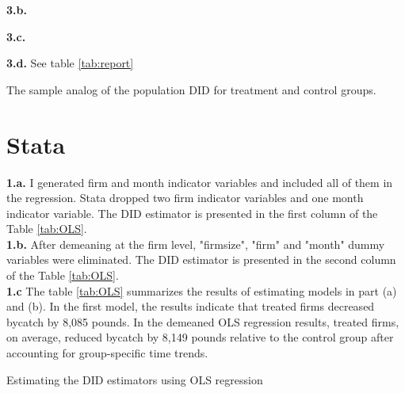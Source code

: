 \documentclass{article}
\begin{document}
\noindent \textbf{3.b.} 

\noindent \textbf{3.c.} 

\noindent \textbf{3.d.} See table \ref{tab:report}

\begin{table}[h]
    \centering
    
    \caption{The sample analog of the population DID for treatment and control groups.}
    \label{tab:report}
\end{table}


\section{Stata}

\noindent \textbf{1.a.} I generated firm and month indicator variables and included all of them in the regression. Stata dropped two firm indicator variables and one month indicator variable. The DID estimator is presented in the first column of the Table \ref{tab:OLS}. \\

\noindent \textbf{1.b.} After demeaning at the firm level, "firmsize", "firm" and "month" dummy variables were eliminated. The DID estimator is presented in the second column of the Table \ref{tab:OLS}. \\

\noindent \textbf{1.c} The table \ref{tab:OLS} summarizes the results of estimating models in part (a) and (b). In the first model, the results indicate that treated firms decreased bycatch by 8,085 pounds. In the demeaned OLS regression results, treated firms, on average, reduced bycatch by 8,149 pounds relative to the control group after accounting for group-specific time trends.

\begin{table}[]
    \centering
    
    \caption{Estimating the DID estimators using OLS regression}
    \label{tab:OLS}
\end{table}
\end{document}
